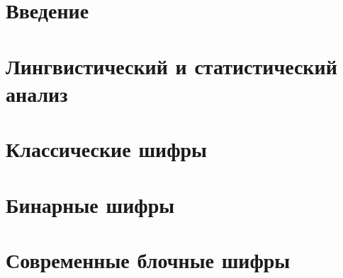 \documentclass[unicode,12pt,a4paper,oneside,fleqn]{article}
\begin{document}
    
    \tableofcontents
    \pagebreak

    
    \section{Введение}
    
    \pagebreak
    
    \section{Лингвистический и статистический анализ}
    
    
    
    
    \pagebreak

    \section{Классические шифры}
    
    
    
    
    
    \pagebreak

    \section{Бинарные шифры}
    
    
    \pagebreak

    \section{Современные блочные шифры}
    
    \pagebreak

    
    
\end{document}

